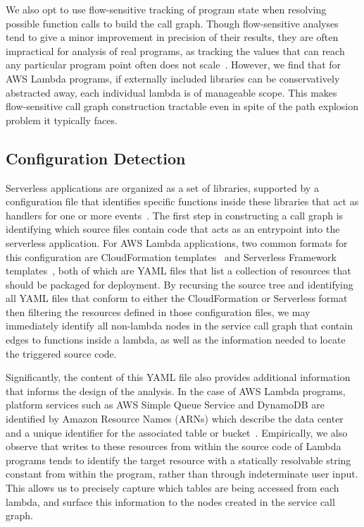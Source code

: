 \documentclass[letterpaper,twocolumn,10pt]{article}
\begin{document}
We also opt to use flow-sensitive tracking of program state when resolving possible function calls to build the call graph. Though flow-sensitive analyses tend to give a minor improvement in precision of their results, they are often impractical for analysis of real programs, as tracking the values that can reach any particular program point often does not scale~\cite{flowsensitivity}. However, we find that for AWS Lambda programs, if externally included libraries can be conservatively abstracted away, each individual lambda is of manageable scope. This makes flow-sensitive call graph construction tractable even in spite of the path explosion problem it typically faces. \par


\subsection{Configuration Detection}
Serverless applications are organized as a set of libraries, supported by a configuration file that identifies specific functions inside these libraries that act as handlers for one or more events~\cite{cloudparadigms}. The first step in constructing a call graph is identifying which source files contain code that acts as an entrypoint into the serverless application. For AWS Lambda applications, two common formats for this configuration are CloudFormation templates~\cite{cloudformation} and Serverless Framework templates~\cite{serverlessframework}, both of which are YAML files that list a collection of resources that should be packaged for deployment. By recursing the source tree and identifying all YAML files that conform to either the CloudFormation or Serverless format then filtering the resources defined in those configuration files, we may immediately identify all non-lambda nodes in the service call graph that contain edges to functions inside a lambda, as well as the information needed to locate the triggered source code. \par

Significantly, the content of this YAML file also provides additional information that informs the design of the analysis. In the case of AWS Lambda programs, platform services such as AWS Simple Queue Service and DynamoDB are identified by Amazon Resource Names (ARNs) which describe the data center and a unique identifier for the associated table or bucket~\cite{arn}. Empirically, we also observe that writes to these resources from within the source code of Lambda programs tends to identify the target resource with a statically resolvable string constant from within the program, rather than through indeterminate user input. This allows us to precisely capture which tables are being accessed from each lambda, and surface this information to the nodes created in the service call graph.
\end{document}
